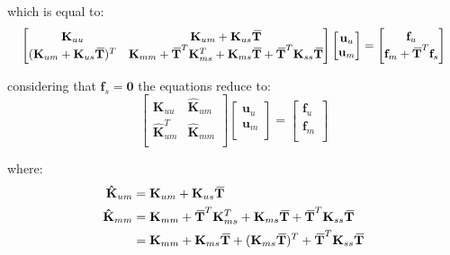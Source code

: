 \documentclass[10pt,b5paper,titlepage]{book}
\newcommand{\m}{\mathbf}
\newcommand{\closure}[2][3]{%
{}\mkern#1mu\overline{\mkern-#1mu#2}}
\newenvironment{eqarray}
{
    \begin{eqnarray}
        \begin{aligned}
}
{
        \end{aligned}
    \end{eqnarray}
}
\begin{document}
which is equal to:
\begin{equation}
    \scalebox{0.95}{
    $ \begin{bmatrix}
        \m{K}_{uu} & \m{K}_{um} + \m{K}_{us} \m{\closure{T}} \\
        (\m{K}_{um} + \m{K}_{us} \m{\closure{T}})^T &
        \m{K}_{mm} + \m{\closure{T}}^T \m{K}_{ms}^T +
        \m{K}_{ms} \m{\closure{T}} + \m{\closure{T}}^T \m{K}_{ss} \m{\closure{T}} \\
    \end{bmatrix}
    \begin{bmatrix}
        \m{u}_u \\
        \m{u}_m \\
    \end{bmatrix}
    = \begin{bmatrix}
        \m{f}_u \\
        \m{f}_m + \m{\closure{T}}^T \m{f}_s \\
    \end{bmatrix} $
    }
\end{equation}

considering that $ \m{f}_s = \m{0} $ the equations reduce to:
\begin{equation}
    \begin{bmatrix}
        \m{K}_{uu} & \m{\hat{K}}_{um} \\
        \m{\hat{K}}_{um}^T & \m{\hat{K}}_{mm} \\
    \end{bmatrix}
    \begin{bmatrix}
        \m{u}_u \\
        \m{u}_m \\
    \end{bmatrix}
    = \begin{bmatrix}
        \m{f}_u \\
        \m{f}_m \\
    \end{bmatrix}
\end{equation}

where:
\begin{eqarray}
    \m{\hat{K}}_{um} &= \m{K}_{um} + \m{K}_{us} \m{\closure{T}} \\
    \m{\hat{K}}_{mm} &= \m{K}_{mm} + \m{\closure{T}}^T \m{K}_{ms}^T
                      + \m{K}_{ms} \m{\closure{T}}
                      + \m{\closure{T}}^T \m{K}_{ss} \m{\closure{T}} \\
                     &= \m{K}_{mm} + \m{K}_{ms} \m{\closure{T}}
                      + (\m{K}_{ms} \m{\closure{T}})^T
                      + \m{\closure{T}}^T \m{K}_{ss} \m{\closure{T}}
\end{eqarray}
\end{document}
